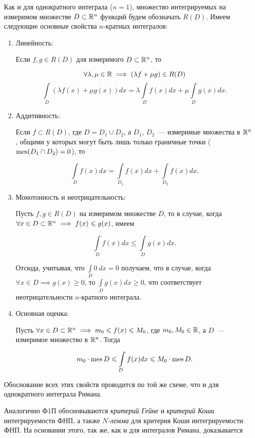 \documentclass[../../main.tex]{subfiles}
\begin{document}
Как и для однократного интеграла ($n = 1$), множество 
интегрируемых на измеримом множестве 
$D \subset \mathbb{R}^n$ функций будем обозначать
$R(D)$. Имеем следующие основные свойства $n$-кратных интегралов:

\begin{enumerate}
	\item Линейность:
	
	Если $f, g \in R(D)$ для измеримого $D \subset \mathbb{R}^n$, то
	
	\[
			\forall \lambda, \mu \in \mathbb{R} \implies (\lambda f + \mu g) \in R(D)
	\]
	\[
			\int\limits_D (\lambda f(x) + \mu g(x))dx = \lambda \int\limits_D f(x)dx +
			\mu \int\limits_D g(x)dx.
	\]
	
	\item Аддитивность:
	
	Если $f \subset R(D)$, где $D = D_1 \cup D_2$, 
	а $D_1$, $D_2$~--- измеримые множества в $\mathbb{R}^n$,
	общими у которых могут быть лишь только граничные точки 
	(${ \operatorname{mes}(D_1 \cap D_2) = 0 }$), то
	
	\[
		\int\limits_{D}f(x)dx = \int\limits_{D_1}f(x)dx + \int\limits_{D_2}f(x)dx.
	\]
		
	\item Монотонность и неотрицательность:
	
	Пусть $f, g \in R(D)$ на измеримом множестве $D$, то 
	в случае, когда 
	$\forall x \in D \subset \mathbb{R}^n \implies f(x) \leqslant g(x)$, имеем
	
	\[
	\int\limits_Df(x)dx \le \int\limits_Dg(x)dx.
	\]
	
	Отсюда, учитывая, что $\int\limits_D0\:dx=0$ получаем, что в случае, когда 
	$\forall x \in D \implies g(x) \ge 0$, то $\int\limits_Dg(x)dx \ge 0$, 
	что соответствует неотрицательности $n$-кратного интеграла.
	
	\item Основная оценка:
	
	Пусть $\forall x \in D \subset \mathbb{R}^n \implies m_0 \leqslant f(x) \leqslant M_0$, где
	$m_0, M_0 \in \mathbb{R}$, а $D$~--- измеримое множество в $\mathbb{R}^n$. Тогда
	
	\[
		m_0 \cdot \operatorname{mes} D \leqslant \int\limits_D f(x) dx \leqslant M_0 \cdot \operatorname{mes} D.
	\]
\end{enumerate}


Обоснование всех этих свойств проводится по той же схеме, 
что и для однократного интеграла Римана.

Аналогично Ф1П обосновываются \emph{критерий Гейне} 
и \emph{критерий Коши} интегрируемости ФНП,
а также \emph{$N$-лемма} для критерия Коши интегрируемости ФНП. 
На основании этого, так же, как и для
интегралов Римана, доказывается
\end{document}
